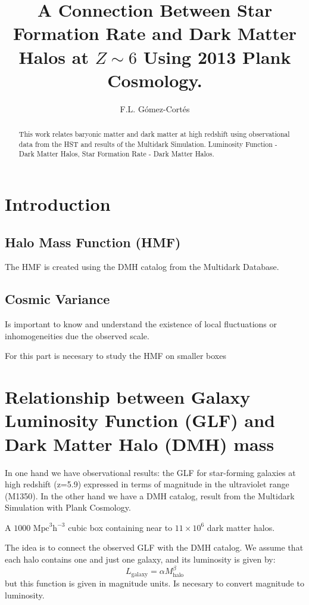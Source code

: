\documentclass[manuscript]{aastex}
\begin{document}
\title{A Connection Between Star Formation Rate and Dark Matter Halos at $Z\sim6$ Using 2013 Plank Cosmology.}

\author{F.L. G\'omez-Cort\'es }

\begin{abstract}
This work relates baryonic matter and dark matter at high redshift using observational data
from the HST and results of the Multidark Simulation.
Luminosity Function - Dark Matter Halos, Star Formation Rate - Dark Matter Halos.
\end{abstract}


\section{Introduction}
\subsection{Halo Mass Function (HMF)}
The HMF is created using the DMH catalog from the Multidark Database.
\subsection{Cosmic Variance}
Is important to know and understand the existence of local fluctuations
or inhomogeneities due the observed scale.

For this part is necesary to study the HMF on smaller boxes

\section{Relationship between Galaxy Luminosity Function (GLF) and
Dark Matter Halo (DMH) mass}

In one hand we have observational results: the GLF for star-forming galaxies at high redshift (z=5.9)\citep{bouwens06,willott07}
expressed in terms of magnitude in the ultraviolet range (M1350). In the other hand we have a DMH 
catalog, result from the Multidark Simulation with Plank Cosmology. %

A $1000 \textrm{ Mpc} ^3 \textrm{h}^{−3}$ cubic box containing near to $11\times10^6$ dark matter halos.

The idea is to connect the observed GLF with the DMH catalog. We assume that each halo contains one and just one galaxy, and its luminosity is given by:
\begin{equation}
L_\textrm{galaxy}=\alpha M_\textrm{halo}^\beta 
\end{equation}
but this function is given in magnitude units. Is necesary to convert magnitude to luminosity.
\end{document}
